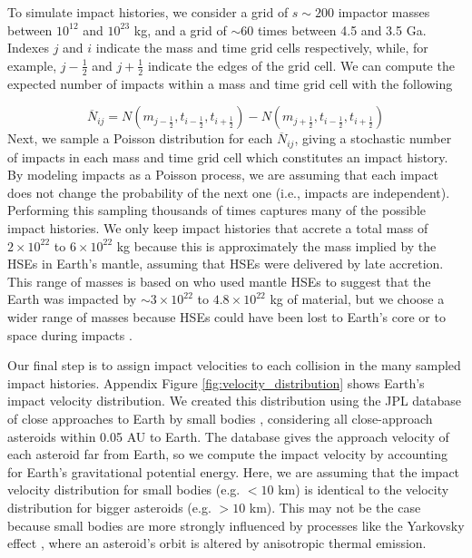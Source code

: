 \documentclass[manuscript]{aastex63}
\begin{document}
To simulate impact histories, we consider a grid of $s\sim 200$ impactor masses between $10^{12}$ and $10^{23}$ kg, and a grid of $\sim 60$ times between 4.5 and 3.5 Ga. Indexes $j$ and $i$ indicate the mass and time grid cells respectively, while, for example, $j-\frac{1}{2}$ and $j+\frac{1}{2}$ indicate the edges of the grid cell. We can compute the expected number of impacts within a mass and time grid cell with the following

\begin{equation}
  \overline{N}_{ij} = N(m_{j-\frac{1}{2}},t_{i-\frac{1}{2}},t_{i+\frac{1}{2}}) - N(m_{j+\frac{1}{2}},t_{i-\frac{1}{2}},t_{i+\frac{1}{2}})
\end{equation}
Next, we sample a Poisson distribution for each $\overline{N}_{ij}$, giving a stochastic number of impacts in each mass and time grid cell which constitutes an impact history. By modeling impacts as a Poisson process, we are assuming that each impact does not change the probability of the next one (i.e., impacts are independent). Performing this sampling thousands of times captures many of the possible impact histories. We only keep impact histories that accrete a total mass of $2 \times 10^{22}$ to $6 \times 10^{22}$ kg because this is approximately the mass implied by the HSEs in Earth's mantle, assuming that HSEs were delivered by late accretion. This range of masses is based on \citet{Day_2015} who used mantle HSEs to suggest that the Earth was impacted by $\sim 3 \times 10^{22}$ to $4.8 \times 10^{22}$ kg of material, but we choose a wider range of masses because HSEs could have been lost to Earth's core or to space during impacts \citep{Marchi_2018}.

Our final step is to assign impact velocities to each collision in the many sampled impact histories. Appendix Figure \ref{fig:velocity_distribution} shows Earth's impact velocity distribution. We created this distribution using the JPL database of close approaches to Earth by small bodies \citep{Park_2023}, considering all close-approach asteroids within 0.05 AU to Earth. The database gives the approach velocity of each asteroid far from Earth, so we compute the impact velocity by accounting for Earth's gravitational potential energy. Here, we are assuming that the impact velocity distribution for small bodies (e.g. $< 10$ km) is identical to the velocity distribution for bigger asteroids (e.g. $> 10$ km). This may not be the case because small bodies are more strongly influenced by processes like the Yarkovsky effect \citep{Bottke_2006}, where an asteroid's orbit is altered by anisotropic thermal emission.
\end{document}
